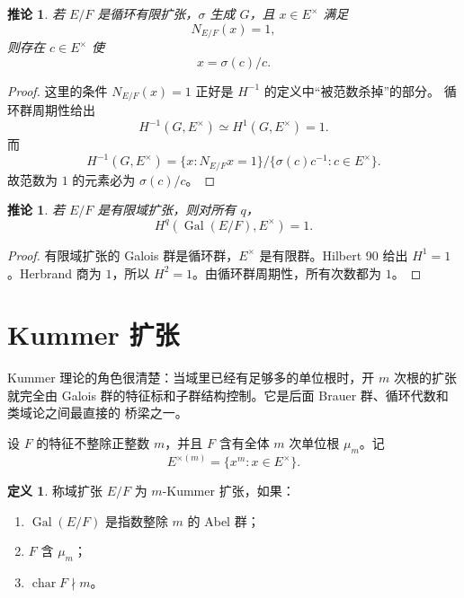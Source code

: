 \documentclass[11pt,a4paper,openany]{ctexbook}
\numberwithin{equation}{chapter}
\theoremstyle{plain}
\newtheorem{corollary}[theorem]{推论}
\theoremstyle{definition}
\newtheorem{definition}[theorem]{定义}
\theoremstyle{remark}
\begin{document}
\begin{corollary}
若 $E/F$ 是循环有限扩张，$\sigma$ 生成 $G$，且 $x\in E^\times$ 满足
\[
 N_{E/F}(x)=1,
\]
则存在 $c\in E^\times$ 使
\[
 x=\sigma(c)/c.
\]
\end{corollary}

\begin{proof}
这里的条件 $N_{E/F}(x)=1$ 正好是 $H^{-1}$ 的定义中“被范数杀掉”的部分。
循环群周期性给出
\[
 H^{-1}(G,E^\times)\simeq H^1(G,E^\times)=1.
\]
而
\[
 H^{-1}(G,E^\times)
 =
 \{x:N_{E/F}x=1\}/\{ \sigma(c)c^{-1}:c\in E^\times\}.
\]
故范数为 $1$ 的元素必为 $\sigma(c)/c$。
\end{proof}

\begin{corollary}
若 $E/F$ 是有限域扩张，则对所有 $q$，
\[
 H^q(\operatorname{Gal}(E/F),E^\times)=1.
\]
\end{corollary}

\begin{proof}
有限域扩张的 Galois 群是循环群，$E^\times$ 是有限群。Hilbert 90 给出 $H^1=1$。Herbrand 商为 $1$，所以 $H^2=1$。由循环群周期性，所有次数都为 $1$。
\end{proof}

\section{Kummer 扩张}

Kummer 理论的角色很清楚：当域里已经有足够多的单位根时，开 $m$ 次根的扩张就完全由
Galois 群的特征标和子群结构控制。它是后面 Brauer 群、循环代数和类域论之间最直接的
桥梁之一。

设 $F$ 的特征不整除正整数 $m$，并且 $F$ 含有全体 $m$ 次单位根 $\mu_m$。记
\[
 E^{\times(m)}=\{x^m:x\in E^\times\}.
\]

\begin{definition}
称域扩张 $E/F$ 为 $m$-Kummer 扩张，如果：
\begin{enumerate}[label=(\arabic*)]
\item $\operatorname{Gal}(E/F)$ 是指数整除 $m$ 的 Abel 群；
\item $F$ 含 $\mu_m$；
\item $\operatorname{char}F\nmid m$。
\end{enumerate}
\end{definition}
\end{document}
